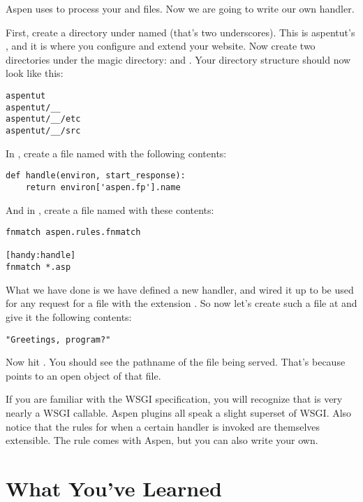 Aspen uses  to process your  and 
files. Now we are going to write our own handler.

First, create a directory under  named \file{__} (that's two
underscores). This is aspentut's , and it is where you
configure and extend your website. Now create two directories under the magic
directory:  and . Your directory structure should now look
like this:

\begin{verbatim}
aspentut
aspentut/__
aspentut/__/etc
aspentut/__/src
\end{verbatim}

In , create a file named  with the following
contents:

\begin{verbatim}
def handle(environ, start_response):
    return environ['aspen.fp'].name
\end{verbatim}

And in , create a file named  with these
contents:

\begin{verbatim}
fnmatch aspen.rules.fnmatch

[handy:handle]
fnmatch *.asp
\end{verbatim}

What we have done is we have defined a new handler, and wired it up to be used
for any request for a file with the extension . So now let's create
such a file at  and give it the following contents:

\begin{verbatim}
"Greetings, program?"
\end{verbatim}

Now hit . You should see the pathname of
the file being served. That's because  points to an
open  object of that file.

If you are familiar with the WSGI specification, you will recognize that
 is very nearly a WSGI callable. Aspen plugins all speak
a slight superset of WSGI. Also notice that the rules for when a certain handler
is invoked are themselves extensible. The  rule comes with Aspen,
but you can also write your own.


\section{What You've Learned \label{tutorial-learned}}

